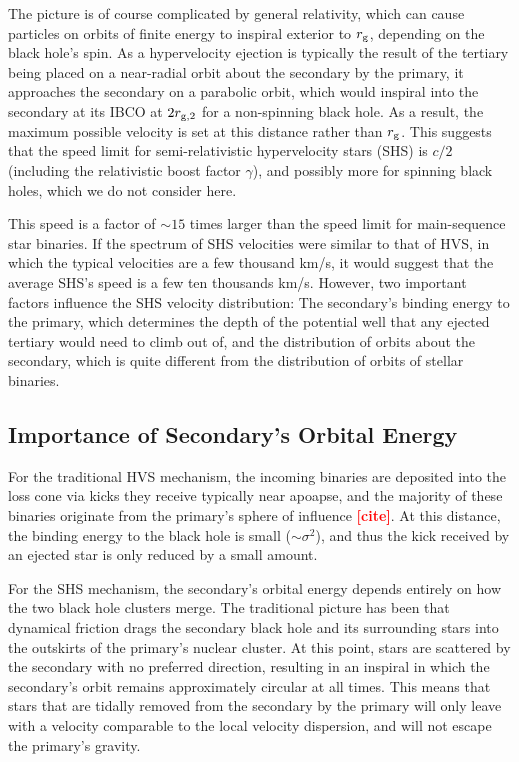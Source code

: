 \documentclass[a4paper,twocolumn]{emulateapj}
\newcommand{\colr}[1]{{\bf \textcolor{red}{[#1]}}}
\begin{document}
The picture is of course complicated by general relativity, which can cause particles on orbits of finite energy to inspiral exterior to $r_{\rm g}$, depending on the black hole's spin. As a hypervelocity ejection is typically the result of the tertiary being placed on a near-radial orbit about the secondary by the primary, it approaches the secondary on a parabolic orbit, which would inspiral into the secondary at its IBCO at $2 r_{\rm g,2}$ for a non-spinning black hole. As a result, the maximum possible velocity is set at this distance rather than $r_{\rm g}$. This suggests that the speed limit for semi-relativistic hypervelocity stars (SHS) is $c/2$ (including the relativistic boost factor $\gamma$), and possibly more for spinning black holes, which we do not consider here.

This speed is a factor of $\sim 15$ times larger than the speed limit for main-sequence star binaries. If the spectrum of SHS velocities were similar to that of HVS, in which the typical velocities are a few thousand km/s, it would suggest that the average SHS's speed is a few ten thousands km/s. However, two important factors influence the SHS velocity distribution: The secondary's binding energy to the primary, which determines the depth of the potential well that any ejected tertiary would need to climb out of, and the distribution of orbits about the secondary, which is quite different from the distribution of orbits of stellar binaries.

\subsection{Importance of Secondary's Orbital Energy}
For the traditional HVS mechanism, the incoming binaries are deposited into the loss cone via kicks they receive typically near apoapse, and the majority of these binaries originate from the primary's sphere of influence \colr{cite}. At this distance, the binding energy to the black hole is small ($\sim \sigma^{2}$), and thus the kick received by an ejected star is only reduced by a small amount.

For the SHS mechanism, the secondary's orbital energy depends entirely on how the two black hole clusters merge. The traditional picture has been that dynamical friction drags the secondary black hole and its surrounding stars into the outskirts of the primary's nuclear cluster. At this point, stars are scattered by the secondary with no preferred direction, resulting in an inspiral in which the secondary's orbit remains approximately circular at all times. This means that stars that are tidally removed from the secondary by the primary will only leave with a velocity comparable to the local velocity dispersion, and will not escape the primary's gravity.
\end{document}
